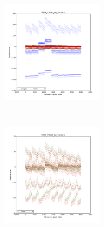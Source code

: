 \begin{center}
\begin{figure}[!h]
    \centering
    \begin{subfigure}[b]{0.45\textwidth}
				\includegraphics[width=\linewidth,height=5cm]{images/MOX/MOX_macro_nu_fission1_with_cocagne.png}
    \end{subfigure}
		~
    \begin{subfigure}[b]{0.45\textwidth}
        \includegraphics[width=\linewidth,height=5cm]{images/MOX/MOX_macro_nu_fission1.png}
    \end{subfigure}


\end{figure}
\end{center}
